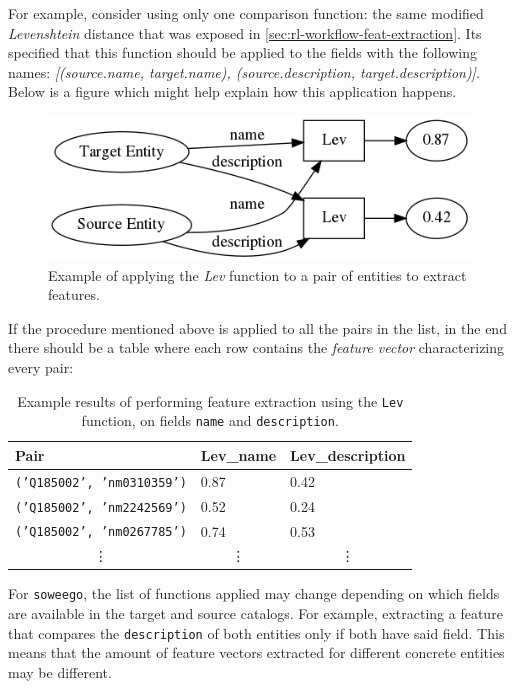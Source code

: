 \documentclass[epsfig,a4paper,11pt,titlepage,twoside,openany]{book}
\begin{document}
For example, consider using only one comparison function: the same modified \textit{Levenshtein} distance that was exposed in \autoref{sec:rl-workflow-feat-extraction}. Its specified that this function should be applied to the fields with the following names: \textit{[(source.name, target.name), (source.description, target.description)]}. Below is a figure which might help explain how this application happens.

\begin{figure}[H]
  \centering \includegraphics[width=.6\textwidth]{feature_extraction}
  \caption{Example of applying the \textit{Lev} function to a pair of entities to extract features.}
  \label{fig:feature-extractions-flow-ex}
\end{figure}

If the procedure mentioned above is applied to all the pairs in the list, in the end there should be a table where each row contains the \textit{feature vector} characterizing every pair:

\begin{table}[H]
\centering
\begin{tabular}{l|l|l}
Pair                     & Lev\_name             & Lev\_description      \\ \hline
\texttt{('Q185002', 'nm0310359')} & 0.87                  & 0.42                  \\
\texttt{('Q185002', 'nm2242569')} & 0.52                  & 0.24                  \\
\texttt{('Q185002', 'nm0267785')} & 0.74                  & 0.53                  \\
\multicolumn{1}{c}{\vdots}    & \multicolumn{1}{c}{\vdots}  & \multicolumn{1}{c}{\vdots}  
\end{tabular}
\caption{Example results of performing feature extraction using the \texttt{Lev} function, on fields \texttt{name} and \texttt{description}.}
\label{tab:soweego-feature-extraction-example-results}
\end{table}


For \texttt{soweego}, the list of functions applied may change depending on which fields are available in the target and source catalogs. For example, extracting a feature that compares the \texttt{description} of both entities only if both have said field. This means that the amount of feature vectors extracted for different concrete entities may be different. 
\end{document}
